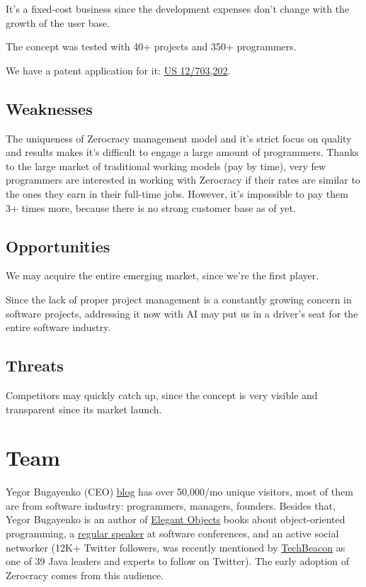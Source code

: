 \documentclass{main}
\begin{document}
It's a fixed-cost business since the development expenses don't change
with the growth of the user base.

The concept was tested with 40+ projects and 350+ programmers.

We have a patent application for it:
\href{https://patents.google.com/patent/US20110196798}{US 12/703,202}.

\subsection{Weaknesses}

The uniqueness of Zerocracy management model and it's strict focus on quality
and results makes it's difficult to engage a large amount of programmers. Thanks
to the large market of traditional working models (pay by time), very few
programmers are interested in working with Zerocracy if their rates are
similar to the ones they earn in their full-time jobs. However, it's impossible
to pay them 3+ times more, because there is no strong customer base as of yet.

\subsection{Opportunities}

We may acquire the entire emerging market, since we're the first player.

Since the lack of proper project management is a constantly growing concern in
software projects, addressing it now with AI may put us in a driver's seat for
the entire software industry.

\subsection{Threats}

Competitors may quickly catch up, since the concept is very visible and
transparent since its market launch.

\section{Team}

Yegor Bugayenko (CEO) \href{http://www.yegor256.com}{blog} has over 50,000/mo unique visitors, most of them are from
software industry: programmers, managers, founders. Besides that, Yegor
Bugayenko is an author of \href{https://amzn.to/2bYXQy7}{Elegant Objects} books about object-oriented
programming, a \href{https://lanyrd.com/profile/yegor256/}{regular speaker} at software conferences, and an active social
networker (12K+ Twitter followers, was recently mentioned by \href{https://techbeacon.com/java-leaders-you-should-follow-twitter}{TechBeacon} as one
of 39 Java leaders and experts to follow on Twitter). The
early adoption of Zerocracy comes from this audience.
\end{document}

